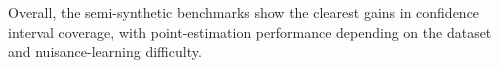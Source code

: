 \documentclass[11pt]{article}
\theoremstyle{plain}
\begin{document}
 



Overall, the semi-synthetic benchmarks show the clearest gains in confidence interval coverage, with point-estimation performance depending on the dataset and nuisance-learning difficulty.%
\end{document}
